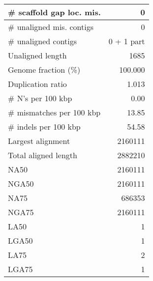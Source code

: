 \documentclass[12pt,a4paper]{article}
\begin{document}
\begin{table}[ht]
\begin{center}
\begin{tabular}{|l*{1}{|r}|}
\# scaffold gap loc. mis. & 0 \\ \hline
\# unaligned mis. contigs & 0 \\ \hline
\# unaligned contigs & 0 + 1 part \\ \hline
Unaligned length & 1685 \\ \hline
Genome fraction (\%) & 100.000 \\ \hline
Duplication ratio & 1.013 \\ \hline
\# N's per 100 kbp & 0.00 \\ \hline
\# mismatches per 100 kbp & 13.85 \\ \hline
\# indels per 100 kbp & 54.58 \\ \hline
Largest alignment & 2160111 \\ \hline
Total aligned length & 2882210 \\ \hline
NA50 & 2160111 \\ \hline
NGA50 & 2160111 \\ \hline
NA75 & 686353 \\ \hline
NGA75 & 2160111 \\ \hline
LA50 & 1 \\ \hline
LGA50 & 1 \\ \hline
LA75 & 2 \\ \hline
LGA75 & 1 \\ \hline
\end{tabular}
\end{center}
\end{table}
\end{document}
